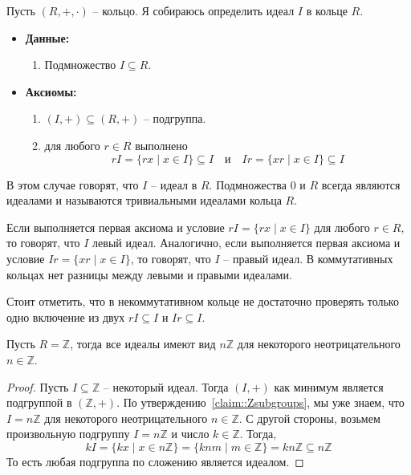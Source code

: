 \begin{definition}
Пусть $(R, +, \cdot)$ -- кольцо.
Я собираюсь определить идеал $I$ в кольце $R$.
\begin{itemize}
\item\textbf{Данные:} 
\begin{enumerate}
\item Подмножество $I\subseteq R$.
\end{enumerate}

\item\textbf{Аксиомы:}
\begin{enumerate}
\item $(I, +)\subseteq (R,+)$ -- подгруппа.

\item для любого $r\in R$ выполнено
\[
r I = \{rx\mid x\in I\} \subseteq I\quad\text{и}\quad Ir = \{xr\mid x\in I\}\subseteq I
\]
\end{enumerate}
\end{itemize}
В этом случае говорят, что $I$ -- идеал в $R$.
Подмножества $0$ и $R$ всегда являются идеалами и называются тривиальными идеалами кольца $R$.

Если выполняется первая аксиома и условие $r I = \{rx\mid x\in I\}$ для любого $r\in R$, то говорят, что $I$ левый идеал.
Аналогично, если выполняется первая аксиома и условие $ Ir = \{xr\mid x\in I\}$, то говорят, что $I$ -- правый идеал.
В коммутативных кольцах нет разницы между левыми и правыми идеалами.
\end{definition}

Стоит отметить, что в некоммутативном кольце не достаточно проверять только одно включение из двух $rI \subseteq I$ и $Ir \subseteq I$.


\begin{claim}
\label{claim::ZIdeals}
Пусть $R = \mathbb Z$, тогда все идеалы имеют вид $n\mathbb Z$ для некоторого неотрицательного $n\in \mathbb Z$.
\end{claim}
\begin{proof}
Пусть $I\subseteq \mathbb Z$ -- некоторый идеал.
Тогда $(I, +)$ как минимум является подгруппой в $(\mathbb Z, +)$.
По утверждению~\ref{claim::Zsubgroups}, мы уже знаем, что $I = n\mathbb Z$ для некоторого неотрицательного $n\in \mathbb Z$.
С другой стороны, возьмем произвольную подгруппу  $I = n\mathbb Z$ и число $k\in \mathbb Z$.
Тогда,
\[
k I = \{k x \mid x\in n\mathbb Z\} = \{kn m\mid m\in \mathbb Z\} = kn\mathbb Z\subseteq n\mathbb Z
\]
То есть любая подгруппа по сложению является идеалом.
\end{proof}


